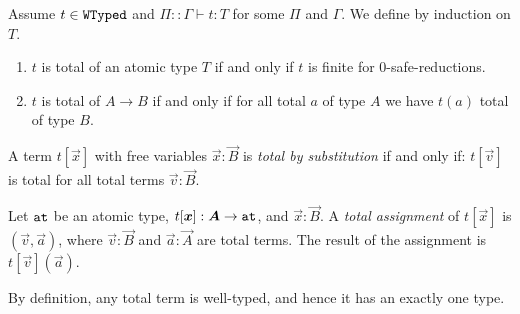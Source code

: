 


\begin{definition}
\label{definition-total-term}
Assume $t \in {\tt WTyped}$ and $\Pi::\Gamma \vdash t : T$ for some $\Pi$ and $\Gamma$.
We define  by induction on $T$. 
\begin{enumerate}
\item
$t$ is total of an atomic type $T$ 
if and only if $t$ is finite for $0$-safe-reductions.

\item
$t$ is total of $A\rightarrow B$ if and only if for all total $a$ of type $A$ we have $t(a)$ total of type $B$.
\end{enumerate}
%
A term $t[\vec{x}]$ with free variables $\vec{x}:\vec{B}$ is \emph{total by substitution} if and only if:
$t[\vec{v}]$ is total for all total terms $\vec{v}:\vec{B}$. 

Let ${\tt at}$ be an atomic type, $t[\vec{x}]:\vec{A}\to \Atom$, and $\vec{x}:\vec{B}$. 
A \emph{total assignment} of $t[\vec{x}]$ is $(\vec{v},\vec{a})$, where 
$\vec{v}:\vec{B}$ and $\vec{a}:\vec{A}$ are total terms.
The result of the assignment is  $t[\vec{v}](\vec{a})$.

\end{definition}

By definition, any total term is well-typed, and hence it has an exactly one type.


